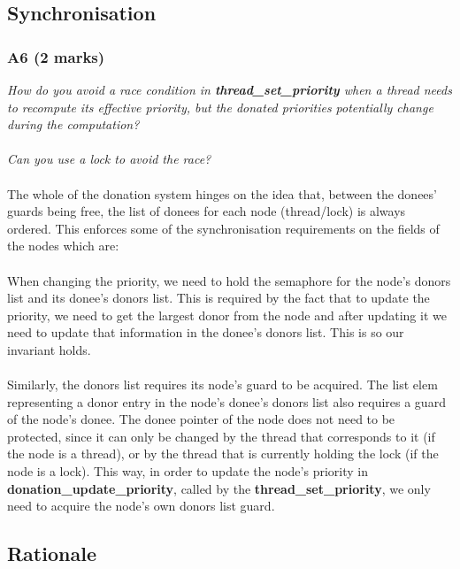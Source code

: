 \documentclass{report}
\newcommand{\question}[1]{\textit{#1} \\ }
\newcommand{\fun}[1]{\textcolor{Emerald}{\textbf{#1}}}
\begin{document}
            \subsection*{Synchronisation}
                \subsubsection*{A6  (2 marks)}
                    \question{How do you avoid a race condition in \fun{thread\_set\_priority} when a thread needs to recompute its effective priority, but the donated priorities potentially change during the computation?
                    \\
                    \\Can you use a lock to avoid the race?}
                    \\The whole of the donation system hinges on the idea that, between the donees' guards being free, 
                    the list of donees for each node (thread/lock) is always ordered.
                    This enforces some of the synchronisation requirements on the fields of the nodes which are: 
                    \\ \\When changing the priority, we need to hold the
                    semaphore for the node's donors list and its donee's donors list. This is required by the fact 
                    that to update the priority, 
                    we need to get the largest donor from the node and after updating it we need to update that information 
                    in the donee's donors list. This is so our invariant holds. 
                    \\ \\ Similarly, the donors list requires its node's guard to be acquired. The list elem representing 
                    a donor entry in the node's
                    donee's donors list also requires a guard of the node's donee. The donee pointer of the node does not need 
                    to be protected, since it can only be
                    changed by the thread that corresponds to it (if the node is a thread), or by the thread that is 
                    currently holding the lock (if the node is a lock).
                    This way, in order to update the node's priority in \fun{donation\_update\_priority}, called by the 
                    \fun{thread\_set\_priority}, we only need to acquire the node's own donors list guard.

            \subsection*{Rationale}
\end{document}
